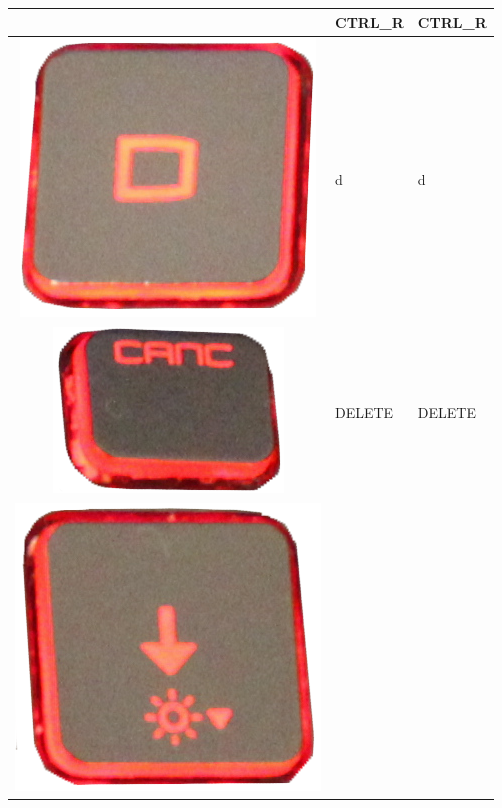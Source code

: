 \begin{longtable}{|cll|}
\begin{minipage}[c]{.3\textwidth}
\vspace{0.2cm}
\end{minipage} & CTRL\_R & CTRL\_R\\
\hline
\begin{minipage}[c]{.3\textwidth}
\vspace{0.2cm}
\includegraphics[scale=0.06]{Images/KeyMapping/d}
\vspace{0.2cm}
\end{minipage} & d & d\\
\hline
\begin{minipage}[c]{.3\textwidth}
\vspace{0.2cm}
\includegraphics[scale=0.06]{Images/KeyMapping/DELETE}
\vspace{0.2cm}
\end{minipage} & DELETE & DELETE\\
\hline
\begin{minipage}[c]{.3\textwidth}
\vspace{0.2cm}
\includegraphics[scale=0.06]{Images/KeyMapping/DOWN}

\end{minipage}
\end{longtable}
